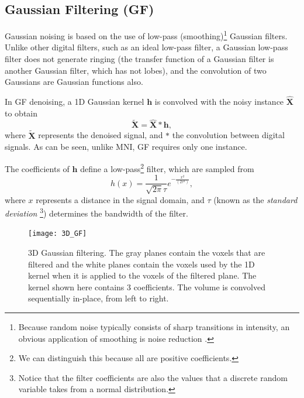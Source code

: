 \documentclass{article}
\begin{document}

\subsection{Gaussian Filtering (GF)}

Gaussian noising is based on the use of low-pass
(smoothing)\footnote{Because random noise typically consists of sharp
  transitions in intensity, an obvious application of smoothing is
  noise reduction \cite{gonzalez1992digital}.} Gaussian
filters. Unlike other digital filters, such as an ideal low-pass
filter, a Gaussian low-pass filter does not generate ringing (the
transfer function of a Gaussian filter is another Gaussian filter,
which has not lobes), and the convolution of two Gaussians are Gaussian
functions also. 

In GF denoising, a 1D Gaussian kernel $\mathbf{h}$ is convolved with
the noisy instance $\hat{\mathbf{X}}$ to obtain
\begin{equation}
  \tilde{\mathbf{X}} = \hat{\mathbf{X}}*\mathbf{h},
  \label{eq:GF}
\end{equation}
where $\tilde{\mathbf{X}}$ represents the denoised signal, and $*$ the
convolution between digital signals. As can be seen, unlike MNI, GF
requires only one instance.

The coefficients of $\mathbf{h}$ define a low-pass\footnote{We can
  distinguish this because all are positive coefficients.}
filter, which are sampled from
\begin{equation}
  h(x) = \frac{1}{\sqrt{2\pi}\tau}e^{-\frac{{x}^2}{(2\tau^2)}},
  \label{eq:GK}
\end{equation}
where $x$ represents a distance in
the signal domain, and $\tau$ (known as the \emph{standard deviation}
\footnote{Notice that the filter coefficients are also the values that a
  discrete random variable takes from a normal distribution.})
determines the bandwidth of the filter.

\begin{figure}
  \centering
  \texttt{[image: 3D\_GF]}
  \caption{3D Gaussian filtering. The gray planes contain the voxels
    that are filtered and the white planes contain the voxels used by
    the 1D kernel when it is applied to the voxels of the filtered
    plane. The kernel shown here contains 3 coefficients. The volume
    is convolved sequentially in-place, from left to
    right.\label{fig:3D_GF}}
\end{figure}
\end{document}
